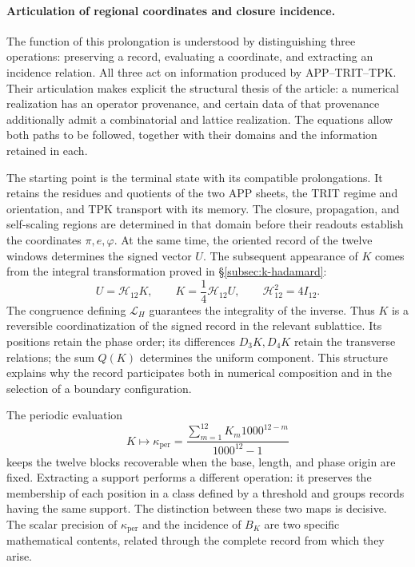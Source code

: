\paragraph{Articulation of regional coordinates and closure incidence.}
\label{inc-ampl-articulacion}
The function of this prolongation is understood by distinguishing
three operations: preserving a record, evaluating a coordinate, and
extracting an incidence relation. All three act on information
produced by APP--TRIT--TPK. Their articulation makes explicit the
structural thesis of the article: a numerical realization has an
operator provenance, and certain data of that provenance additionally admit a
combinatorial and lattice realization. The equations allow both
paths to be followed, together with their domains and the information retained in each.

The starting point is the terminal state with its compatible
prolongations. It retains the residues and quotients of the two APP
sheets, the TRIT regime and orientation, and TPK transport with its memory.
The closure, propagation, and self-scaling regions are determined in that
domain before their readouts establish the coordinates
$\pi,e,\varphi$. At the same time, the oriented record of the twelve
windows determines the signed vector $U$. The subsequent appearance of $K$
comes from the integral transformation proved in
\S\ref{subsec:k-hadamard}:
\begin{equation}
 U=\mathcal H_{12}K,\qquad
 K=\frac14\mathcal H_{12}U,\qquad
 \mathcal H_{12}^{2}=4I_{12}.
 \label{inc-ampl-registro}
\end{equation}
The congruence defining $\mathcal L_H$ guarantees the integrality of
the inverse. Thus $K$ is a reversible coordinatization
of the signed record in the relevant sublattice. Its positions retain
the phase order; its differences $D_3K,D_4K$ retain the transverse
relations; the sum $Q(K)$ determines the uniform component. This
structure explains why the record participates both in numerical composition
and in the selection of a boundary configuration.

The periodic evaluation
\[
 K\longmapsto\kappa_{\mathrm{per}}
 =\frac{\sum_{m=1}^{12}K_m1000^{12-m}}{1000^{12}-1}
\]
keeps the twelve blocks recoverable when the base, length, and
phase origin are fixed. Extracting a support performs a different
operation: it preserves the membership of each position in a class defined
by a threshold and groups records having the same support. The
distinction between these two maps is decisive. The scalar precision
of $\kappa_{\mathrm{per}}$ and the incidence of $B_K$ are two
specific mathematical contents, related through the complete
record from which they arise.
